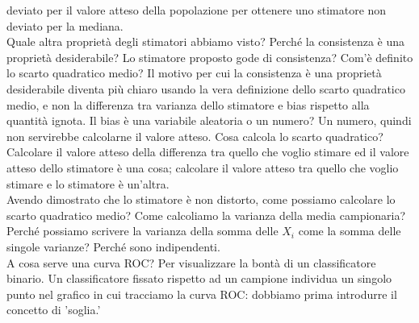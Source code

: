 \documentclass{article}
\begin{document}
    deviato per il valore atteso della popolazione per ottenere uno stimatore non deviato per la mediana. \\
    Quale altra proprietà degli stimatori abbiamo visto? Perché la consistenza è una proprietà desiderabile? Lo stimatore proposto gode di consistenza? Com'è definito lo
    scarto quadratico medio? Il motivo per cui la consistenza è una proprietà desiderabile diventa più chiaro usando la vera definizione dello scarto quadratico medio, e non
    la differenza tra varianza dello stimatore e bias rispetto alla quantità ignota. Il bias è una variabile aleatoria o un numero? Un numero, quindi non servirebbe calcolarne
    il valore atteso. Cosa calcola lo scarto quadratico? Calcolare il valore atteso della differenza tra quello che voglio stimare ed il valore atteso dello stimatore è una
    cosa; calcolare il valore atteso tra quello che voglio stimare e lo stimatore è un'altra. \\
    Avendo dimostrato che lo stimatore è non distorto, come possiamo calcolare lo scarto quadratico medio? Come calcoliamo la varianza della media campionaria? Perché possiamo
    scrivere la varianza della somma delle $ X_i $ come la somma delle singole varianze? Perché sono indipendenti. \\
    A cosa serve una curva ROC? Per visualizzare la bontà di un classificatore binario. Un classificatore fissato rispetto ad un campione individua un singolo punto nel
    grafico in cui tracciamo la curva ROC: dobbiamo prima introdurre il concetto di 'soglia.' \\
    
\end{document}
